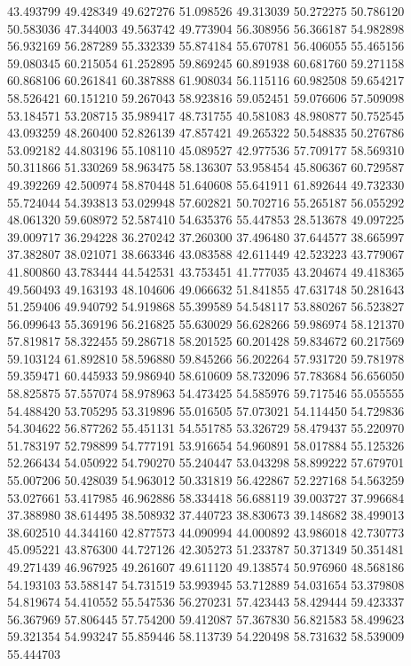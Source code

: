 43.493799
49.428349
49.627276
51.098526
49.313039
50.272275
50.786120
50.583036
47.344003
49.563742
49.773904
56.308956
56.366187
54.982898
56.932169
56.287289
55.332339
55.874184
55.670781
56.406055
55.465156
59.080345
60.215054
61.252895
59.869245
60.891938
60.681760
59.271158
60.868106
60.261841
60.387888
61.908034
56.115116
60.982508
59.654217
58.526421
60.151210
59.267043
58.923816
59.052451
59.076606
57.509098
53.184571
53.208715
35.989417
48.731755
40.581083
48.980877
50.752545
43.093259
48.260400
52.826139
47.857421
49.265322
50.548835
50.276786
53.092182
44.803196
55.108110
45.089527
42.977536
57.709177
58.569310
50.311866
51.330269
58.963475
58.136307
53.958454
45.806367
60.729587
49.392269
42.500974
58.870448
51.640608
55.641911
61.892644
49.732330
55.724044
54.393813
53.029948
57.602821
50.702716
55.265187
56.055292
48.061320
59.608972
52.587410
54.635376
55.447853
28.513678
49.097225
39.009717
36.294228
36.270242
37.260300
37.496480
37.644577
38.665997
37.382807
38.021071
38.663346
43.083588
42.611449
42.523223
43.779067
41.800860
43.783444
44.542531
43.753451
41.777035
43.204674
49.418365
49.560493
49.163193
48.104606
49.066632
51.841855
47.631748
50.281643
51.259406
49.940792
54.919868
55.399589
54.548117
53.880267
56.523827
56.099643
55.369196
56.216825
55.630029
56.628266
59.986974
58.121370
57.819817
58.322455
59.286718
58.201525
60.201428
59.834672
60.217569
59.103124
61.892810
58.596880
59.845266
56.202264
57.931720
59.781978
59.359471
60.445933
59.986940
58.610609
58.732096
57.783684
56.656050
58.825875
57.557074
58.978963
54.473425
54.585976
59.717546
55.055555
54.488420
53.705295
53.319896
55.016505
57.073021
54.114450
54.729836
54.304622
56.877262
55.451131
54.551785
53.326729
58.479437
55.220970
51.783197
52.798899
54.777191
53.916654
54.960891
58.017884
55.125326
52.266434
54.050922
54.790270
55.240447
53.043298
58.899222
57.679701
55.007206
50.428039
54.963012
50.331819
56.422867
52.227168
54.563259
53.027661
53.417985
46.962886
58.334418
56.688119
39.003727
37.996684
37.388980
38.614495
38.508932
37.440723
38.830673
39.148682
38.499013
38.602510
44.344160
42.877573
44.090994
44.000892
43.986018
42.730773
45.095221
43.876300
44.727126
42.305273
51.233787
50.371349
50.351481
49.271439
46.967925
49.261607
49.611120
49.138574
50.976960
48.568186
54.193103
53.588147
54.731519
53.993945
53.712889
54.031654
53.379808
54.819674
54.410552
55.547536
56.270231
57.423443
58.429444
59.423337
56.367969
57.806445
57.754200
59.412087
57.367830
56.821583
58.499623
59.321354
54.993247
55.859446
58.113739
54.220498
58.731632
58.539009
55.444703
